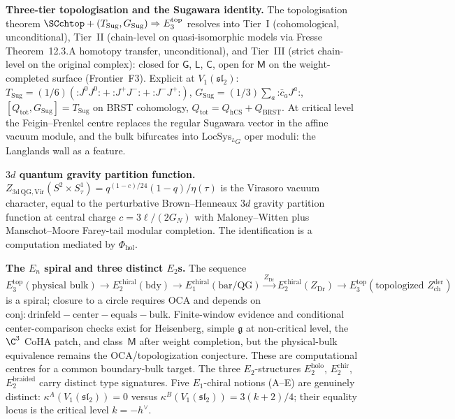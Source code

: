 \smallskip\noindent\textbf{Three-tier topologisation and the Sugawara
identity.} The topologisation theorem
$\SCchtop + (T_{\mathrm{Sug}},G_{\mathrm{Sug}})\Rightarrow E_3^{\mathrm{top}}$ resolves
into Tier~I (cohomological, unconditional), Tier~II (chain-level on
quasi-isomorphic models via Fresse Theorem~12.3.A homotopy transfer,
unconditional), and Tier~III (strict chain-level on the original
complex): closed for $\mathsf G$, $\mathsf L$, $\mathsf C$, open for
$\mathsf M$ on the weight-completed surface (Frontier~F3). Explicit at
$V_1(\mathfrak{sl}_2)$:
$T_{\mathrm{Sug}} = (1/6)(\mathord{:}J^0J^0\mathord{:}
+\mathord{:}J^+J^-\mathord{:}+\mathord{:}J^-J^+\mathord{:})$,
$G_{\mathrm{Sug}} = (1/3)\sum_a\mathord{:}\bar c_a J^a\mathord{:}$,
$[Q_{\mathrm{tot}},G_{\mathrm{Sug}}]=T_{\mathrm{Sug}}$ on BRST
cohomology, $Q_{\mathrm{tot}}=Q_{\mathrm{hCS}}+Q_{\mathrm{BRST}}$. At
critical level the Feigin--Frenkel centre replaces the regular
Sugawara vector in the affine vacuum module, and the bulk
bifurcates into $\mathrm{LocSys}_{^LG}$ oper moduli: the Langlands
wall as a feature.

\smallskip\noindent\textbf{$3d$ quantum gravity partition function.}
$Z_{3\mathrm{d\,QG, Vir}}(S^2\times S^1_\tau) = q^{(1-c)/24}(1-q)/\eta(\tau)$
is the Virasoro vacuum character, equal to the perturbative
Brown--Henneaux $3d$ gravity partition function at central charge
$c = 3\ell/(2G_N)$ with Maloney--Witten plus Manschot--Moore
Farey-tail modular completion. The identification is a computation
mediated by $\Phi_{\mathrm{hol}}$.

\smallskip\noindent\textbf{The $E_n$ spiral and three distinct
$E_2$s.} The sequence
$E_3^{\mathrm{top}}(\text{physical bulk})\to E_2^{\mathrm{chiral}}(\text{bdy})
\to E_1^{\mathrm{chiral}}(\text{bar/QG})\xrightarrow{Z_{\mathrm{Dr}}}
E_2^{\mathrm{chiral}}(Z_{\mathrm{Dr}})\to
E_3^{\mathrm{top}}(\text{topologized }Z^{\mathrm{der}}_{\mathrm{ch}})$
is a spiral; closure to a circle requires OCA and depends on
$\mathrm{conj:drinfeld-center-equals-bulk}$. Finite-window evidence and
conditional center-comparison checks exist for Heisenberg, simple
$\mathfrak g$ at non-critical level, the $\C^3$ CoHA patch, and
class~$\mathsf M$ after weight completion, but the physical-bulk
equivalence remains the OCA/topologization conjecture. These are
computational centres for a common boundary-bulk target. The three $E_2$-structures
$E_2^{\mathrm{holo}}$, $E_2^{\mathrm{chir}}$, $E_2^{\mathrm{braided}}$
carry distinct type signatures. Five $E_1$-chiral notions (A--E) are
genuinely distinct: $\kappa^A(V_1(\mathfrak{sl}_2))=0$ versus
$\kappa^B(V_1(\mathfrak{sl}_2))=3(k+2)/4$; their equality locus is the
critical level $k=-h^\vee$.

